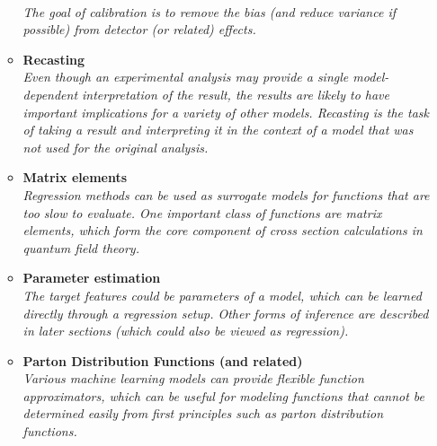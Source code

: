 \documentclass[12pt,letterpaper]{article}
\begin{document}
\begin{itemize}
\begin{itemize}
		\\\textit{The goal of calibration is to remove the bias (and reduce variance if possible) from detector (or related) effects.}
		\item \textbf{Recasting}~\cite{Goodsell:2024aig,Hammad:2022wpq,1806026,Bertone:2016mdy,Caron:2017hku}
		\\\textit{Even though an experimental analysis may provide a single model-dependent interpretation of the result, the results are likely to have important implications for a variety of other models.  Recasting is the task of taking a result and interpreting it in the context of a model that was not used for the original analysis.}
		\item \textbf{Matrix elements}~\cite{Heimel:2023ngj,Kaidisch:2023lwp,Maitre:2023dqz,Janssen:2023ahv,Badger:2022hwf,Dersy:2022bym,Alnuqaydan:2022ncd,Karl:2022jda,Winterhalder:2021ngy,Danziger:2021eeg,Maitre:2021uaa,Aylett-Bullock:2021hmo,Sombillo:2021rxv,Sombillo:2021yxe,Bury:2020ewi,1804325,Bishara:2019iwh,Badger:2020uow}
		\\\textit{Regression methods can be used as surrogate models for functions that are too slow to evaluate.  One important class of functions are matrix elements, which form the core component of cross section calculations in quantum field theory.}
		\item \textbf{Parameter estimation}~\cite{Biro:2024tzv,Simkina:2023ztj,Dubey:2023pro,Yang:2023rbg,Schroder:2023akt,Goos:2023opq,Shi:2023xfz,AlHammal:2023svo,Qiu:2023ihi,Garg:2022tal,Meng:2022lmd,Castro:2022zpq,Craven:2021ems,Alda:2021rgt,Kim:2021pcz,Lazzarin:2020uvv,1808105,Lei:2020ucb}
		\\\textit{The target features could be parameters of a model, which can be learned directly through a regression setup.  Other forms of inference are described in later sections (which could also be viewed as regression).}
		\item \textbf{Parton Distribution Functions (and related)}~\cite{Chowdhury:2024ymm,Kriesten:2024are,Liuti:2024umy,Yan:2024yir,Barontini:2024dyb,Ochoa-Oregon:2024zgm,Soleymaninia:2024jam,Bertone:2024taw,Costantini:2024xae,Gombas:2024rvw,DallOlio:2024vjv,NNPDF:2024dpb,NNPDF:2024djq,Kriesten:2023uoi,Rabemananjara:2023xfq,Fernando:2023obn,Wang:2023poi,Kassabov:2023hbm,Wang:2023nab,Candido:2023utz,Gao:2022srd,Gao:2022uhg,Iranipour:2022iak,Khalek:2021gon,Ball:2021xlu,Ball:2021leu,Carrazza:2021hny,Rossi:2020sbh,Grigsby:2020auv,DelDebbio:2020rgv}
		\\\textit{Various machine learning models can provide flexible function approximators, which can be useful for modeling functions that cannot be determined easily from first principles such as parton distribution functions.}

\end{itemize}
\end{itemize}
\end{document}
